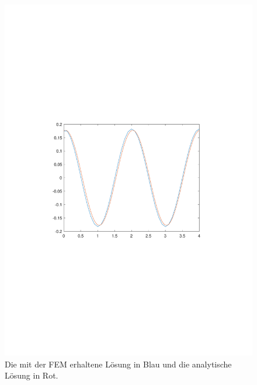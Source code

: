 %
%
%
\begin{figure}
    \centering
    \includegraphics[width=\textwidth]{papers/fem/images/loesung_rechenbsp.pdf}
    \caption{Die mit der FEM erhaltene Lösung in Blau und die analytische Lösung in Rot.}
    \label{fem:rechenbsp:loesung}
    \end{figure}
    